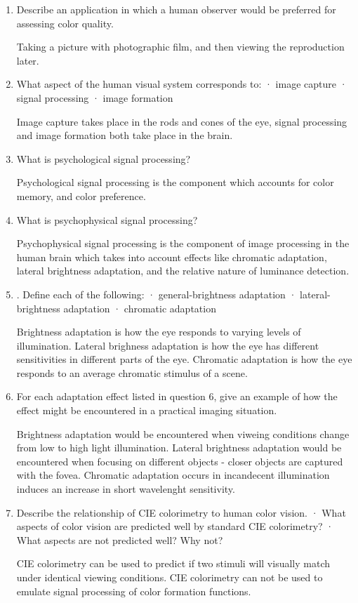 \begin{enumerate}
\item Describe an application in which a human observer would be
preferred for assessing color quality.
\par Taking a picture with photographic film, and then viewing the
reproduction later.

\item What aspect of the human visual system corresponds to:
 · image capture
 · signal processing
 · image formation
\par Image capture takes place in the rods and cones of the eye,
signal processing and image formation both take place in the
brain.

\item What is psychological signal processing?
\par Psychological signal processing is the component which
accounts for color memory, and color preference.

 \item What is psychophysical signal processing?
\par Psychophysical signal processing is the component of image
processing in the human brain which takes into account effects
like chromatic adaptation, lateral brightness adaptation, and the
relative nature of luminance detection.

\item. Define each of the following:
 · general-brightness adaptation
 · lateral-brightness adaptation
 · chromatic adaptation
 \par Brightness adaptation is how the eye responds to varying
 levels of illumination.  Lateral brighness adaptation is how the
 eye has different sensitivities in different parts of the eye.
 Chromatic adaptation is how the eye responds to an average chromatic
 stimulus of a scene.

\item For each adaptation effect listed in question 6, give an
example of how the effect might be encountered in a practical
imaging situation.
\par Brightness adaptation would be encountered when viweing
conditions change from low to high light illumination.  Lateral
brightness adaptation would be encountered when focusing on
different objects - closer objects are captured with the fovea.
Chromatic adaptation occurs in incandecent illumination induces an
increase in short wavelenght sensitivity.

\item Describe the relationship of CIE colorimetry to human color
vision.
 · What aspects of color vision are predicted well by standard CIE colorimetry?
 · What aspects are not predicted well? Why not?
\par CIE colorimetry can be used to predict if two stimuli will
visually match under identical viewing conditions.  CIE
colorimetry can not be used to emulate signal processing of color
formation functions.


\end{enumerate}
